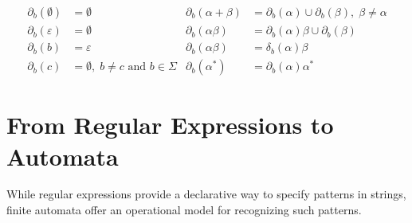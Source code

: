 \begin{align*}
	\partial_b(\emptyset) &= \emptyset		&	\partial_b(\alpha + \beta) &= \partial_b(\alpha) \cup \partial_b(\beta), \; \beta \neq \alpha \\
	\partial_b(\varepsilon) &= \emptyset	&	\partial_b(\alpha \beta) &= \partial_b(\alpha)\beta \cup \partial_b(\beta)\\
	\partial_b(b) &= \varepsilon & \partial_b(\alpha \beta) &= \delta_b(\alpha)\beta \\
	\partial_b(c) &= \emptyset, \; b \neq c \text{ and } b \in \Sigma & \partial_b(\alpha^*) &= \partial_b(\alpha)\alpha^*
\end{align*}


%

\section{From Regular Expressions to Automata}
While regular expressions provide a declarative way to specify patterns in strings, finite automata offer an operational model for recognizing such patterns.



